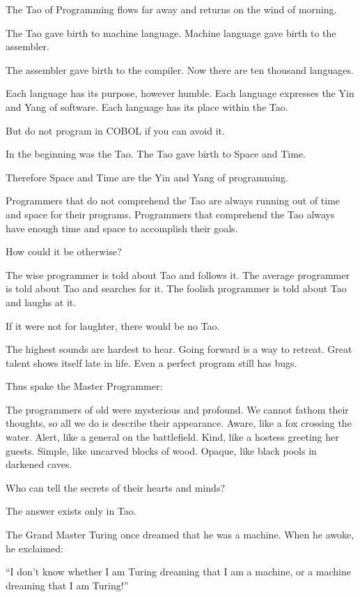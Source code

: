 The Tao of Programming flows far away and returns on the wind of morning.

The Tao gave birth to machine language. Machine language gave birth to
the assembler.

The assembler gave birth to the compiler. Now there are ten thousand
languages.

Each language has its purpose, however humble. Each language expresses
the Yin and Yang of software. Each language has its place within the
Tao.

But do not program in COBOL if you can avoid it.

In the beginning was the Tao. The Tao gave birth to Space and Time.

Therefore Space and Time are the Yin and Yang of programming.

Programmers that do not comprehend the Tao are always running out of
time and space for their programs. Programmers that comprehend the Tao
always have enough time and space to accomplish their goals.

How could it be otherwise?

The wise programmer is told about Tao and follows it. The average
programmer is told about Tao and searches for it. The foolish
programmer is told about Tao and laughs at it.

If it were not for laughter, there would be no Tao.

The highest sounds are hardest to hear. Going forward is a way to
retreat. Great talent shows itself late in life. Even a perfect
program still has bugs.

Thus spake the Master Programmer:

The programmers of old were mysterious and profound. We cannot fathom
their thoughts, so all we do is describe their appearance.
\startverse%
Aware, like a fox crossing the water.
Alert, like a general on the battlefield.
Kind, like a hostess greeting her guests.
Simple, like uncarved blocks of wood.
Opaque, like black pools in darkened caves.
\endverse

Who can tell the secrets of their hearts and minds?

The answer exists only in Tao.

The Grand Master Turing once dreamed that he was a machine. When he
awoke, he exclaimed:

``I don't know whether I am Turing dreaming that I am a machine, or a
machine dreaming that I am Turing!''

